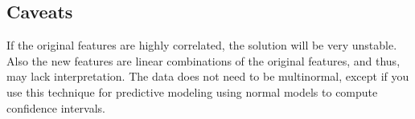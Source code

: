 \documentclass[a4paper,12pt]{article}
\begin{document}
\subsection*{Caveats}

If the original features are highly correlated, the solution will be very unstable. Also the new features are linear combinations of the original features, and thus, may lack interpretation. The data does not need to be multinormal, except if you use this technique for predictive modeling using normal models to compute confidence intervals.
\end{document}
